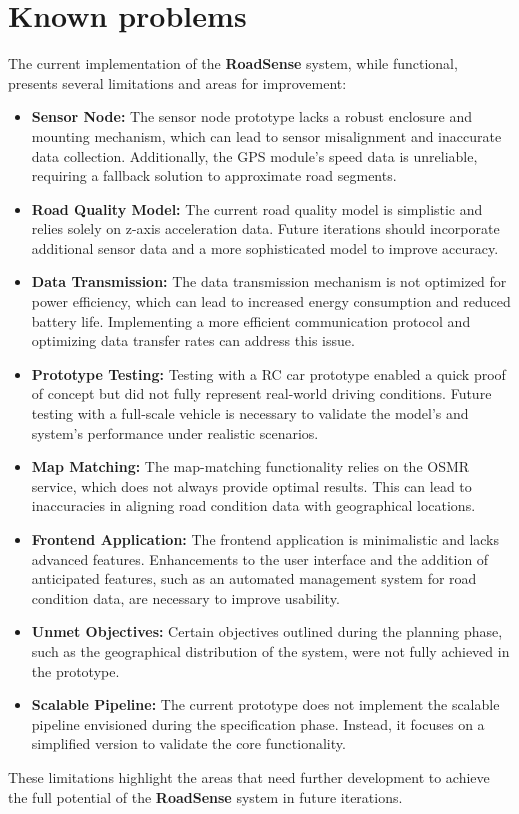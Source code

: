\section{Known problems}

The current implementation of the \textbf{RoadSense} system, while functional, presents several limitations and areas for improvement:

\begin{itemize}
    \item \textbf{Sensor Node:} The sensor node prototype lacks a robust enclosure and mounting mechanism, which can lead to sensor misalignment and inaccurate data collection. Additionally, the GPS module's speed data is unreliable, requiring a fallback solution to approximate road segments.
    \item \textbf{Road Quality Model:} The current road quality model is simplistic and relies solely on z-axis acceleration data. Future iterations should incorporate additional sensor data and a more sophisticated model to improve accuracy.
    \item \textbf{Data Transmission:} The data transmission mechanism is not optimized for power efficiency, which can lead to increased energy consumption and reduced battery life. Implementing a more efficient communication protocol and optimizing data transfer rates can address this issue.
    \item \textbf{Prototype Testing:} Testing with a RC car prototype enabled a quick proof of concept but did not fully represent real-world driving conditions. Future testing with a full-scale vehicle is necessary to validate the model's and system's performance under realistic scenarios.
    \item \textbf{Map Matching:} The map-matching functionality relies on the OSMR service, which does not always provide optimal results. This can lead to inaccuracies in aligning road condition data with geographical locations.
    \item \textbf{Frontend Application:} The frontend application is minimalistic and lacks advanced features. Enhancements to the user interface and the addition of anticipated features, such as an automated management system for road condition data, are necessary to improve usability.
    \item \textbf{Unmet Objectives:} Certain objectives outlined during the planning phase, such as the geographical distribution of the system, were not fully achieved in the prototype.
    \item \textbf{Scalable Pipeline:} The current prototype does not implement the scalable pipeline envisioned during the specification phase. Instead, it focuses on a simplified version to validate the core functionality.
\end{itemize}

\noindent These limitations highlight the areas that need further development to achieve the full potential of the \textbf{RoadSense} system in future iterations.
